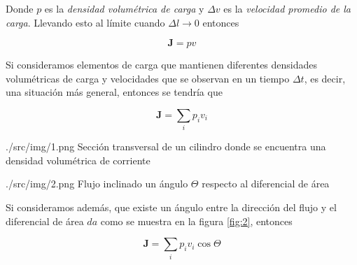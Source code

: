 Donde $p$ es la \emph{densidad volumétrica de carga} y $\Delta v$ es la \emph{velocidad promedio de la carga}. Llevando esto al límite cuando $\Delta l \rightarrow 0$ entonces

\begin{equation}
    \textbf{J} = pv
\end{equation}

Si consideramos elementos de carga que mantienen diferentes densidades volumétricas de carga y velocidades que se observan en un tiempo $\Delta t$, es decir, una situación más general, entonces se tendría que

\begin{equation}
    \textbf{J} = \sum_{i} p_i v_i
\end{equation}

\imagen
    {./src/img/1.png}
    {Sección transversal de un cilindro donde se encuentra una densidad volumétrica de corriente}
    {\label{fig:1}}

\imagen
    {./src/img/2.png}
    {Flujo inclinado un ángulo $\Theta$ respecto al diferencial de área}
    {\label{fig:2}}

Si consideramos además, que existe un ángulo entre la dirección del flujo y el diferencial de área $da$ como se muestra en la figura \ref*{fig:2}, entonces

\begin{equation}
    \textbf{J} = \sum_{i} p_i v_i \cos \Theta
\end{equation}
